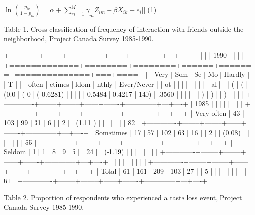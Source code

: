 $\ln\left( \frac{p_{ik}}{1 - p_{ik}} \right) = \alpha + {\sum_{m = 1}^{M}\gamma}_{m}Z_{im} + \beta X_{ik} + e_{i}$[] (1)

Table 1. Cross-classification of frequency of interaction with friends outside the neighborhood, Project Canada Survey 1985-1990.

+-------------+--------+--------+------+-------+--------------+---+----+ |             |        |        | 1990 |       |              |   |    | +=============+========+========+======+=======+==============+===+====+ |             | Very   | Som    | Se   | Mo    | Hardly       |   | T  | |             | often  | etimes | ldom | nthly | Ever/Never   |   | ot | |             |        |        |      |       |              |   | al | |             | (      | (      | (0.0 | (-0   | (-0.6281)    |   |    | |             | 0.5484 | 0.4217 | 140) | .3560 |              |   |    | |             | )      | )      |      | )     |              |   |    | +-------------+--------+--------+------+-------+--------------+---+----+ | 1985        |        |        |      |       |              |   |    | +-------------+--------+--------+------+-------+--------------+---+----+ | Very often  | 43     | 103    | 99   | 31    | 6            |   | 2  | | (1.11 )     |        |        |      |       |              |   | 82 | +-------------+--------+--------+------+-------+--------------+---+----+ | Sometimes   | 17     | 57     | 102  | 63    | 16           |   | 2  | | (0.08)      |        |        |      |       |              |   | 55 | +-------------+--------+--------+------+-------+--------------+---+----+ | Seldom      | 1      | 1      | 8    | 9     | 5            |   | 24 | | (-1.19)     |        |        |      |       |              |   |    | +-------------+--------+--------+------+-------+--------------+---+----+ |             |        |        |      |       |              |   |    | +-------------+--------+--------+------+-------+--------------+---+----+ | Total       | 61     | 161    | 209  | 103   | 27           |   | 5  | |             |        |        |      |       |              |   | 61 | +-------------+--------+--------+------+-------+--------------+---+----+

Table 2. Proportion of respondents who experienced a taste loss event, Project Canada Survey 1985-1990.

